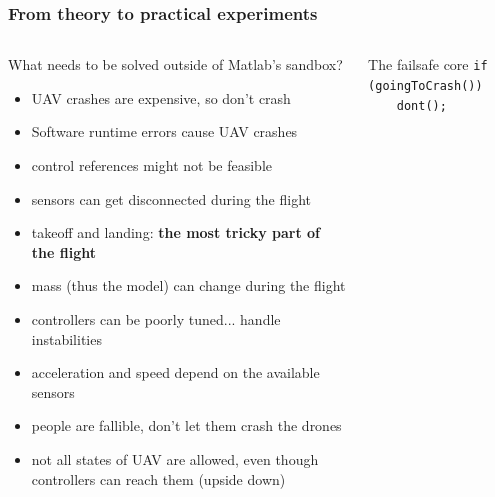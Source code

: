\documentclass[aspectratio=169]{beamer}
\begin{document}
\begin{frame}
\begin{columns}[c]


\end{columns}

\end{frame}



\begin{frame}
  \frametitle{From theory to practical experiments}

  \begin{columns}[c]

    \begin{block}{What needs to be solved outside of Matlab's sandbox?}
      \begin{itemize}
        \item UAV crashes are expensive, so don't crash
        \item Software runtime errors cause UAV crashes
        \item control references might not be feasible
        \item sensors can get disconnected during the flight
        \item takeoff and landing: \textbf{the most tricky part of the flight}
        \item mass (thus the model) can change during the flight
        \item controllers can be poorly tuned... handle instabilities
        \item acceleration and speed depend on the available sensors
        \item people are fallible, don't let them crash the drones
        \item not all states of UAV are allowed, even though controllers can reach them (upside down)
      \end{itemize}
    \end{block}

    \begin{block}{The failsafe core}
      \texttt{if (goingToCrash())}\\
      \texttt{~~~~dont();}
    \end{block}

  \end{columns}

\end{frame}
\end{document}
